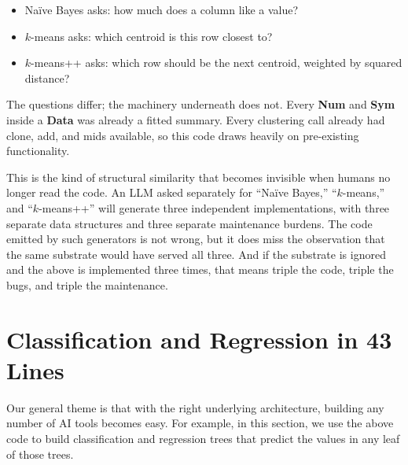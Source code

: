 \documentclass[AMA,STIX2COL]{WileyNJDv5}
\newcommand{\cls}[1]{%
  \setlength{\fboxsep}{1.5pt}%
  \colorbox{clsbg}{\sffamily\bfseries{#1}}%
}
\begin{document}
\begin{itemize}
\item Naïve Bayes asks: how much does a column like a value?
\item $k$-means asks: which centroid is this row closest to?
\item $k$-means++ asks: which row should be the next centroid,
weighted by squared distance?
\end{itemize}
The questions differ; the machinery underneath does not. Every
\cls{Num} and \cls{Sym} inside a \cls{Data} was already a fitted
summary. Every clustering call already had \textsf{clone},
\textsf{add}, and \textsf{mids} available, so this code draws heavily on
pre-existing functionality.

This is the kind of structural similarity that becomes invisible
when humans no longer read the code. An LLM asked separately for
``Naïve Bayes,'' ``$k$-means,'' and ``$k$-means++'' will
generate three independent implementations, with three separate
data structures and three separate maintenance burdens. The
code emitted by such generators is not wrong,
but it does miss the observation that the same substrate would
have served all three. And if the substrate is ignored and the above
is implemented three times, that  means
triple the code, triple the bugs,  and triple the maintenance. 


  \section{Classification and Regression in 43 Lines}\label{trees}

 

 Our general theme is that with the right underlying
 architecture, building any number of AI tools becomes
 easy.
For example, in this section, we use the above code to build
classification and regression trees that predict the values in
any leaf of those trees.
 
\end{document}
